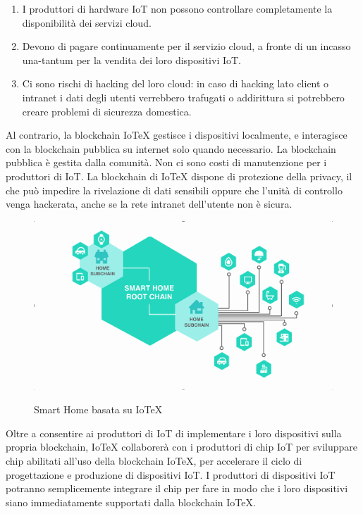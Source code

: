 \begin{enumerate}
    \item I produttori di hardware IoT non possono controllare completamente la disponibilità dei servizi cloud.

    \item Devono di pagare continuamente per il servizio cloud, a fronte di un incasso una-tantum per la vendita dei loro dispositivi IoT.

    \item Ci sono rischi di hacking del loro cloud: in caso di hacking lato client o intranet i dati degli utenti verrebbero trafugati o addirittura si potrebbero creare problemi di sicurezza domestica.
\end{enumerate}

Al contrario, la blockchain IoTeX gestisce i dispositivi localmente, e interagisce con la blockchain pubblica su internet solo quando necessario. La blockchain pubblica è gestita dalla comunità. Non ci sono costi di manutenzione per i produttori di IoT. La blockchain di IoTeX dispone di protezione della privacy, il che può impedire la rivelazione di dati sensibili oppure che l'unità di controllo venga hackerata, anche se la rete intranet dell'utente non è sicura.

\begin{figure}
    \centering
    \includegraphics[width=\textwidth]{Figura8}
    \label{fig:Figura8}
    \caption{Smart Home basata su IoTeX}
\end{figure}

Oltre a consentire ai produttori di IoT di implementare i loro dispositivi sulla propria blockchain, IoTeX collaborerà con i produttori di chip IoT per sviluppare chip abilitati all'uso della blockchain IoTeX, per accelerare il ciclo di progettazione e produzione di dispositivi IoT. I produttori di dispositivi IoT potranno semplicemente integrare il chip per fare in modo che i loro dispositivi siano immediatamente supportati dalla blockchain IoTeX.


